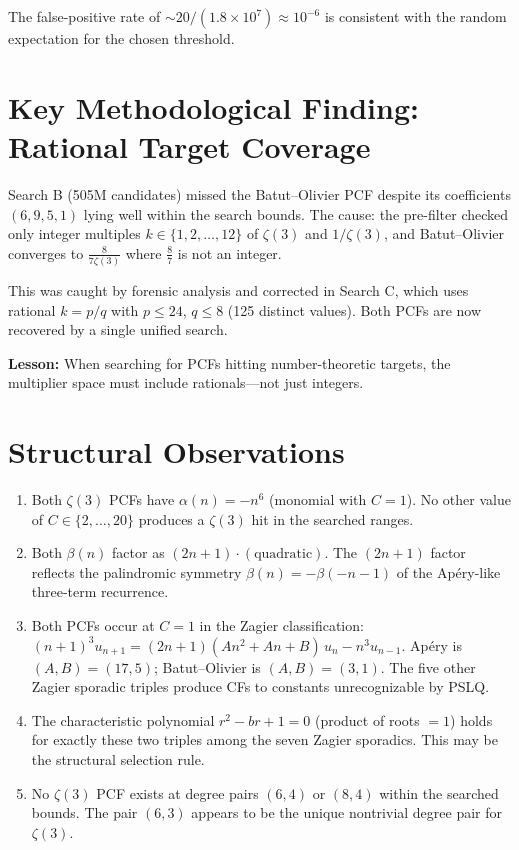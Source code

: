 \documentclass[11pt]{article}
\begin{document}
\noindent The false-positive rate of $\sim 20/(1.8\times 10^7) \approx
10^{-6}$ is consistent with the random expectation for the chosen threshold.

\section{Key Methodological Finding: Rational Target Coverage}

Search B (505M candidates) missed the Batut--Olivier PCF despite its
coefficients $(6,9,5,1)$ lying well within the search bounds.  The cause:
the pre-filter checked only integer multiples
$k \in \{1,2,\ldots,12\}$ of $\zeta(3)$ and $1/\zeta(3)$, and
Batut--Olivier converges to $\tfrac{8}{7\zeta(3)}$ where $\tfrac{8}{7}$
is not an integer.

This was caught by forensic analysis and corrected in Search C, which uses
rational $k = p/q$ with $p \leq 24$, $q \leq 8$ (125 distinct values).
Both PCFs are now recovered by a single unified search.

\textbf{Lesson:} When searching for PCFs hitting number-theoretic targets,
the multiplier space must include rationals---not just integers.

\section{Structural Observations}

\begin{enumerate}
\item Both $\zeta(3)$ PCFs have $\alpha(n) = -n^6$ (monomial with $C=1$).
No other value of $C \in \{2,\ldots,20\}$ produces a $\zeta(3)$ hit in the
searched ranges.
\item Both $\beta(n)$ factor as $(2n+1) \cdot (\text{quadratic})$.  The
$(2n+1)$ factor reflects the palindromic symmetry
$\beta(n) = -\beta(-n-1)$ of the Ap\'ery-like three-term recurrence.
\item Both PCFs occur at $C=1$ in the Zagier classification:
$(n+1)^3 u_{n+1} = (2n+1)(An^2+An+B)\,u_n - n^3 u_{n-1}$.
Ap\'ery is $(A,B)=(17,5)$; Batut--Olivier is $(A,B)=(3,1)$.
The five other Zagier sporadic triples produce CFs to constants
unrecognizable by PSLQ.
\item The characteristic polynomial $r^2-br+1=0$ (product of roots $=1$)
holds for exactly these two triples among the seven Zagier sporadics.
This may be the structural selection rule.
\item No $\zeta(3)$ PCF exists at degree pairs $(6,4)$ or $(8,4)$ within the
searched bounds.  The pair $(6,3)$ appears to be the unique nontrivial
degree pair for $\zeta(3)$.
\end{enumerate}
\end{document}
